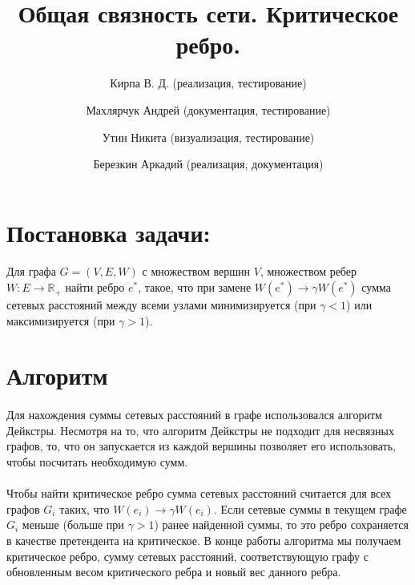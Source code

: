\documentclass[12pt]{article}
\begin{document}
\title{Общая связность сети. Критическое ребро.}

\author{
  Кирпа В. Д. (реализация, тестирование)
  \and
  Махлярчук Андрей (документация, тестирование)
  \and
  Утин Никита (визуализация, тестирование)
  \and
  Березкин Аркадий (реализация, документация)
}

\maketitle
\thispagestyle{empty}
\newpage

\tableofcontents
\listoffigures

\newpage

\section{Постановка задачи:}

\paragraph{}
Для графа $G = (V, E, W)$ с множеством вершин $V$,
множеством ребер $W: E \rightarrow \mathbb{R}_+$
найти ребро $e^*$, такое, что при замене
$W(e^*) \rightarrow \gamma W(e^*)$ сумма сетевых 
расстояний между всеми узлами минимизируется
(при $\gamma < 1$) или максимизируется (при $\gamma > 1$).

\section{Алгоритм}

\paragraph{}
Для нахождения суммы сетевых расстояний в графе использовался
алгоритм Дейкстры\cite{dijkstra}. Несмотря на то, что алгоритм
Дейкстры не подходит для несвязных графов, то, что он запускается
из каждой вершины позволяет его использовать, чтобы посчитать необходимую сумм.

\paragraph{}
Чтобы найти критическое ребро сумма сетевых расстояний считается
для всех графов $G_i$ таких, что $W(e_i) \rightarrow \gamma W(e_i)$. Если сетевые суммы 
в текущем графе $G_i$ меньше (больше при $\gamma > 1$)
ранее найденной суммы, то это ребро сохраняется в качестве претендента
на критическое. В конце работы алгоритма мы получаем критическое ребро, 
сумму сетевых расстояний, соответствующую графу с обновленным весом критического ребра и новый вес данного ребра.
\end{document}
